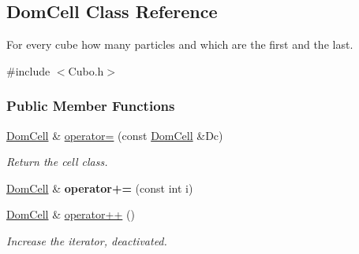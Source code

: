\hypertarget{classDomCell}{}\subsection{Dom\+Cell Class Reference}
\label{classDomCell}


For every cube how many particles and which are the first and the last.  




{\ttfamily \#include $<$Cubo.\+h$>$}

\subsubsection*{Public Member Functions}
\begin{DoxyCompactItemize}
\item 
\hyperlink{classDomCell}{Dom\+Cell} \& \hyperlink{classDomCell_adc9b4853c13b6aeef8c0100c42ca2ec2}{operator=} (const \hyperlink{classDomCell}{Dom\+Cell} \&Dc)\hypertarget{classDomCell_adc9b4853c13b6aeef8c0100c42ca2ec2}{}\label{classDomCell_adc9b4853c13b6aeef8c0100c42ca2ec2}

\begin{DoxyCompactList}\small\item\em Return the cell class. \end{DoxyCompactList}\item 
\hyperlink{classDomCell}{Dom\+Cell} \& {\bfseries operator+=} (const int i)\hypertarget{classDomCell_ae3b231faf50835be1440642d5eca0269}{}\label{classDomCell_ae3b231faf50835be1440642d5eca0269}

\item 
\hyperlink{classDomCell}{Dom\+Cell} \& \hyperlink{classDomCell_ab51a086364b690c5a35890cc25d2ae1e}{operator++} ()\hypertarget{classDomCell_ab51a086364b690c5a35890cc25d2ae1e}{}\label{classDomCell_ab51a086364b690c5a35890cc25d2ae1e}

\begin{DoxyCompactList}\small\item\em Increase the iterator, deactivated. \end{DoxyCompactList}\end{DoxyCompactItemize}

